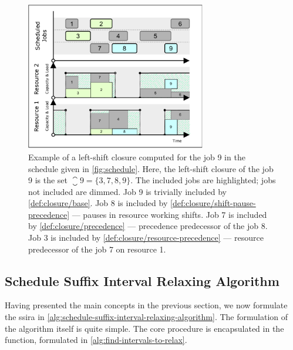 \begin{figure}[p]
    \centering
    \includegraphics[width=0.7\textwidth]{img/Schedule-Closure.pdf}
    \caption{
        Example of a left-shift closure computed for the job 9 in the schedule given in \cref{fig:schedule}.
        Here, the left-shift closure of the job 9 is the set $\closure{9} = \{ 3, 7, 8, 9 \}$.
        The included jobs are highlighted; jobs not included are dimmed.
        Job 9 is trivially included by \cref{def:closure/base}.
        Job 8 is included by \cref{def:closure/shift-pause-precedence} --- pauses in resource working shifts.
        Job 7 is included by \cref{def:closure/precedence} --- precedence predecessor of the job 8.
        Job 3 is included by \cref{def:closure/resource-precedence} --- resource predecessor of the job 7 on resource 1.
        }
    \label{fig:schedule-closure}
\end{figure}

\subsection{Schedule Suffix Interval Relaxing Algorithm} \label{subsec:extended-solution/schedule-suffix-interal-relaxing-algorithm}

Having presented the main concepts in the previous section,
we now formulate the \acf{ssira} in \cref{alg:schedule-suffix-interval-relaxing-algorithm}.
The formulation of the algorithm itself is quite simple.
The core procedure is encapsulated in the
 function,
formulated in \cref{alg:find-intervals-to-relax}.


